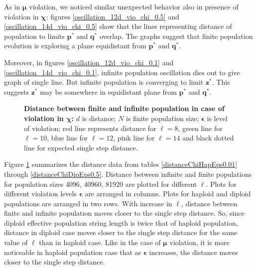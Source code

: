 As in $\bm{\mu}$ violation, we noticed similar unexpected behavior also in presence of violation in $\bm{\chi}$: 
figures \ref{oscillation_12d_vio_chi_0.5} and \ref{oscillation_14d_vio_chi_0.5} 
show that the lines representing distance of population to limits $\bm{p}^\ast$ and $\bm{q}^\ast$ overlap. 
The graphs suggest that finite population evolution is exploring a plane equidistant from $\bm{p}^\ast$ and $\bm{q}^\ast$.

Moreover, in figures \ref{oscillation_12d_vio_chi_0.1} and \ref{oscillation_14d_vio_chi_0.1}, infinite population oscillation dies out to 
give graph of single line. But infinite population is converging to limit $\bm{z}^\ast$. 
This suggests $\bm{z}^\ast$ may be somewhere in equidistant plane from $\bm{p}^\ast$ and $\bm{q}^\ast$.

\begin{figure}[!ht]
\begin{center}
\hspace{-3em}%
\caption[\textbf{Distance between finite and infinite population in case of violation in $\bm{\chi}$}]{\textbf{Distance between finite and infinite population in case of violation in $\bm{\chi}$:}  
  $d$ is distance; $N$ is finite population size; $\bm{\epsilon}$ is level of violation; 
  red line represents distance for $\ell = 8$, green line for $\ell = 10$, blue line for $\ell = 12$, pink line for $\ell = 14$ 
  and black dotted line for expected single step distance.}
\label{vio_chi_dist}
\end{center}
\end{figure}

Figure \ref{vio_chi_dist} summarizes the distance data from tables \ref{distanceChiHapEps0.01} through 
\ref{distanceChiDipEps0.5}. Distance between infinite and finite populations 
for population sizes {4096, 40960, 81920} are plotted for different $\ell$. 
Plots for different violation levels $\bm{\epsilon}$ are arranged in columns. 
Plots for haploid and diploid populations are arranged in two rows. With increase in $\ell$, 
distance between finite and infinite population moves closer to the single step distance. So, since diploid effective population 
string length is twice that of haploid population, 
distance in diploid case moves closer to the single step distance for the same value of $\ell$ than in haploid case. 
Like in the case of $\bm{\mu}$ violation, it is more noticeable in haploid population case that as $\bm{\epsilon}$ increases, 
the distance moves closer to the single step distance.

